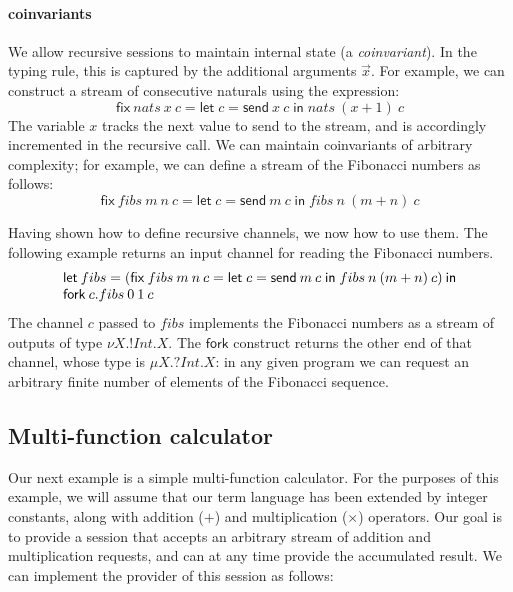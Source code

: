 \documentclass[orivec,envcountsame]{llncs}
\makeatletter
\newcommand{\mkwd}[1]{\mathsf{#1}}
\newcommand{\gvsend}[2]{\mkwd{send}\:#1\:#2}
\newcommand{\gvlet}[3]{\mkwd{let}\;#1 = #2\;\mkwd{in}\;#3}
\newcommand{\gvfork}[2]{\mkwd{fork}\:#1.#2}
\newcommand{\lrkwd}{\mkwd{fix}}
\newcommand{\gvfix}[3]{\lrkwd\:#1\:#2 = #3}
\newcommand{\key}{\mkwd}
\newcommand{\ba}{\begin{array}}
\newcommand{\ea}{\end{array}}
\newcommand{\bl}{\ba[t]{@{}l@{}}}
\newcommand{\el}{\ea}
\makeatother
\begin{document}
\paragraph{coinvariants}

We allow recursive sessions to maintain internal state (a \emph{coinvariant}). In the typing rule,
this is captured by the additional arguments $\vec{x}$. For example, we can construct a stream of
consecutive naturals using the expression:
\[
  \gvfix{nats}{x\:c}{\gvlet{c}{\gvsend{x}{c}}{nats\:(x + 1)\:c}}
\]
The variable $x$ tracks the next value to send to the stream, and is accordingly incremented in the
recursive call. We can maintain coinvariants of arbitrary complexity; for example, we can define a
stream of the Fibonacci numbers as follows:
\[
  \gvfix{fibs}{m\:n\:c}{\gvlet{c}{\gvsend{m}{c}}{fibs\:n\:(m + n)\:c}}
\]

Having shown how to define recursive channels, we now how to use them. The following example returns
an input channel for reading the Fibonacci numbers.
\[
\bl
\key{let}\:fibs = (\gvfix{fibs}{m\:n\:c}{\gvlet{c}{\gvsend{m}{c}}{fibs\:n\:(m + n)\:c}})\:\key{in} \\
\gvfork{c}{fibs\:0\:1\:c} \\
\el
\]
The channel $c$ passed to $fibs$ implements the Fibonacci numbers as a stream of outputs of type
$\nu X.!Int.X$. The $\key{fork}$ construct returns the other end of that channel, whose type is $\mu
X.?Int.X$: in any given program we can request an arbitrary finite number of elements of the
Fibonacci sequence.

\subsection{Multi-function calculator}

Our next example is a simple multi-function calculator. For the purposes of this example, we will
assume that our term language has been extended by integer constants, along with addition ($+$) and
multiplication ($\times$) operators.  Our goal is to provide a session that accepts an arbitrary
stream of addition and multiplication requests, and can at any time provide the accumulated result.
We can implement the provider of this session as follows:

\newcommand{\mcl}[2]{\multicolumn{#1}{l}{#2}}
\end{document}
